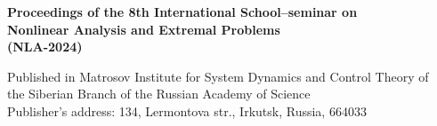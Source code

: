 \documentclass[12pt,final]{llncs}
\begin{document}


\begin{englisharticle}

\end{englisharticle}

\begin{englisharticle}

\end{englisharticle}

\begin{englisharticle}

\end{englisharticle}

\begin{englisharticle}

\end{englisharticle}



\begin{englisharticle}

\end{englisharticle}

\begin{englisharticle}

\end{englisharticle}

\begin{englisharticle}

\end{englisharticle}

\begin{englisharticle}

\end{englisharticle}

\begin{englisharticle}

\end{englisharticle}

\begin{englisharticle}

\end{englisharticle}


\newpage

\newpage
\thispagestyle{empty}
 \begin{englisharticle}
\begin{center}
${}$
\vfill




{\bf  Proceedings of the 8th International School--seminar on\\[0.3em]
 Nonlinear Analysis and Extremal Problems\\[0.3em]  (NLA-2024)}

\vfill\vfill



Published in Matrosov Institute for System Dynamics and Control Theory
of\\ the Siberian Branch of the Russian Academy of Science\\[0.5em]

Publisher's address: 134, Lermontova str., Irkutsk, Russia, 664033

\end{center}

 \end{englisharticle}
\end{document}
